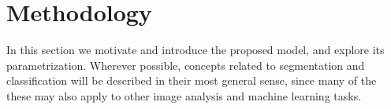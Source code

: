 \chapter{Methodology}
In this section we motivate and introduce the proposed model, and explore its parametrization. Wherever possible, concepts related to segmentation and classification will be described in their most general sense, since many of the these may also apply to other image analysis and machine learning tasks.
